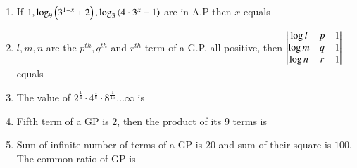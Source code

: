 \documentclass[journal]{IEEEtran}
\begin{document}
\begin{enumerate}[label={\arabic*.}]

	\item {If $ 1, \log_9 \left(3^{1-x} +2\right), \log_3 \left(4\cdot3^x -1\right)$ are in A.P then $x$ equals}
{\hfill{}}
\begin{enumerate}
\end{enumerate}
\item {$l, m, n$ are the $p^{th}, q^{th}$ and $r^{th}$ term of a G.P. all positive, then $\begin{vmatrix}\log l & p & 1 \\ \log m & q & 1 \\ \log n & r & 1 \end{vmatrix}$ equals}
{\hfill{}} 
\begin{enumerate}
\end{enumerate}
\item {The value of $2^{\frac{1}{4}}\cdot 4^{\frac{1}{8}}\cdot 8^{\frac{1}{16}} \ldots \infty$ is}
{\hfill{}} 
\begin{enumerate}
\end{enumerate}
\item {Fifth term of a GP is $2$, then the product of its $9$ terms is}
{\hfill{}}
\begin{enumerate}	
\end{enumerate}
\item {Sum of infinite number of terms of a GP is $20$ and sum of their square is $100$. The common ratio of GP is}
{\hfill{}} 
\begin{enumerate}
\begin{multicols}{2}


\end{multicols}
\end{enumerate}
\end{enumerate}
\end{document}
